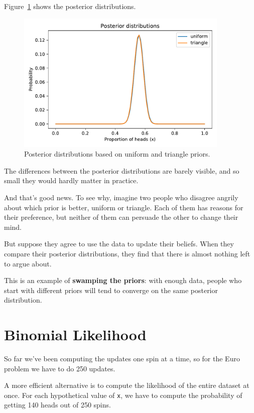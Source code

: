 \documentclass[12pt]{book}
\theoremstyle{exercise}
\newcommand{\py}[1]{{\tt #1}}%
\begin{document}
Figure~\ref{fig03-04} shows the posterior distributions.

\begin{figure}
\centerline{\includegraphics[width=4in]{figs/fig03-04.pdf}}
\caption{Posterior distributions based on uniform and triangle priors.}
\label{fig03-04}
\end{figure}

The differences between the posterior distributions are barely visible, and so small they would hardly matter in practice.

And that's good news.
To see why, imagine two people who disagree angrily about which prior is better, uniform or triangle.
Each of them has reasons for their preference, but neither of them can persuade the other to change their mind.

But suppose they agree to use the data to update their beliefs.
When they compare their posterior distributions, they find that there is almost nothing left to argue about.

This is an example of {\bf swamping the priors}: with enough
data, people who start with different priors will tend to
converge on the same posterior distribution.



\section{Binomial Likelihood}
\label{binomlike}

So far we've been computing the updates one spin at a time, so for the Euro problem we have to do 250 updates.

A more efficient alternative is to compute the likelihood of the entire dataset at once.
For each hypothetical value of \py{x}, we have to compute the probability of getting 140 heads out of 250 spins.
\end{document}

